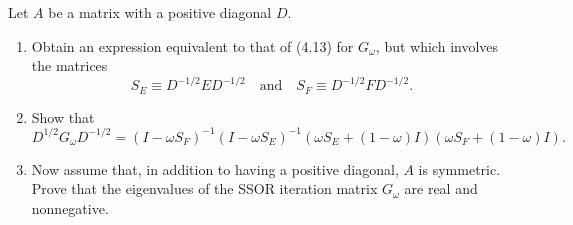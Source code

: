 \documentclass{ctexart}
\begin{document}
 \begin{problem}
Let \(A\) be a matrix with a positive diagonal \(D\).
\begin{enumerate}[label=(\alph*)]
  \item Obtain an expression equivalent to that of (4.13) for \(G_{\omega}\), 
  but which involves the matrices
  \[
    S_E \equiv D^{-1/2} E D^{-1/2}
    \quad \text{and} \quad
    S_F \equiv D^{-1/2} F D^{-1/2}.
  \]

  \item Show that
  \[
    D^{1/2} G_{\omega} D^{-1/2}
    = (I - \omega S_F)^{-1} (I - \omega S_E)^{-1}
      (\omega S_E + (1 - \omega) I)
      (\omega S_F + (1 - \omega) I).
  \]

  \item Now assume that, in addition to having a positive diagonal, 
  \(A\) is symmetric.  
  Prove that the eigenvalues of the SSOR iteration matrix \(G_{\omega}\) 
  are real and nonnegative.
\end{enumerate}
\end{problem}
\end{document}
